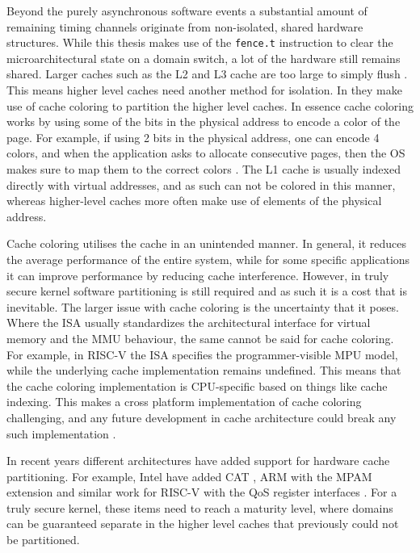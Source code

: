 Beyond the purely asynchronous software events a substantial amount of
remaining timing channels originate from non-isolated, shared hardware
structures. While this thesis makes use of the \texttt{fence.t} instruction to
clear the microarchitectural state on a domain switch, a lot of the hardware
still remains shared. Larger caches such as the L2 and L3 cache are too large
to simply flush \cite{wistoff2023}. This means higher level caches need another
method for isolation. In \cite{ge2019} they make use of cache coloring to
partition the higher level caches. In essence cache coloring works by using
some of the bits in the physical address to encode a color of the page. For
example, if using 2 bits in the physical address, one can encode 4 colors, and
when the application asks to allocate consecutive pages, then the OS makes sure
to map them to the correct colors \cite{dinh, WhatCacheColoring}. The L1 cache
is usually indexed directly with virtual addresses, and as such can not be
colored in this manner, whereas higher-level caches more often make use of
elements of the physical address.

Cache coloring utilises the cache in an unintended manner. In general, it
reduces the average performance of the entire system, while for some specific
applications it can improve performance by reducing cache interference.
However, in truly secure kernel software partitioning is still required and as
such it is a cost that is inevitable. The larger issue with cache coloring is
the uncertainty that it poses. Where the ISA usually standardizes the
architectural interface for virtual memory and the MMU behaviour, the same
cannot be said for cache coloring. For example, in RISC-V the ISA specifies the
programmer-visible MPU model, while the underlying cache implementation remains
undefined. This means that the cache coloring implementation is CPU-specific
based on things like cache indexing. This makes a cross platform implementation
of cache coloring challenging, and any future development in cache architecture
could break any such implementation \cite{WhatCacheColoring}.

In recent years different architectures have added support for hardware cache
partitioning. For example, Intel have added CAT
\cite{IntroductionCacheAllocation}, ARM with the MPAM extension
\cite{LearnarchitectureMemory} and similar work for RISC-V with the QoS
register interfaces \cite{11IntroductionRISCV}. For a truly secure kernel,
these items need to reach a maturity level, where domains can be guaranteed
separate in the higher level caches that previously could not be partitioned.

